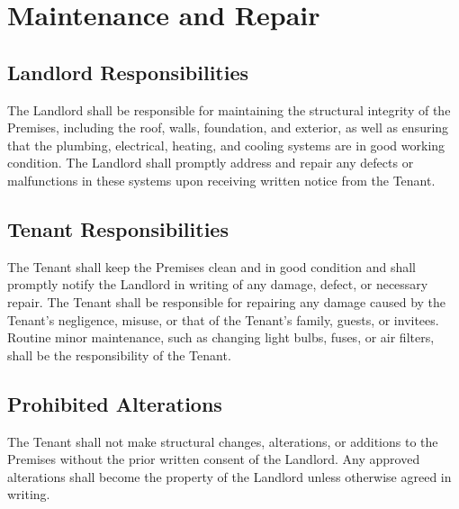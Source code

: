 
\section{Maintenance and Repair}
\label{sec:maintenance}

\subsection{Landlord Responsibilities}
\label{sec:landlordresponsibilities}
The Landlord shall be responsible for maintaining the structural integrity of the Premises, including the roof, walls, foundation, and exterior, as well as ensuring that the plumbing, electrical, heating, and cooling systems are in good working condition. The Landlord shall promptly address and repair any defects or malfunctions in these systems upon receiving written notice from the Tenant.

\subsection{Tenant Responsibilities}
\label{sec:tenantresponsibilities}
The Tenant shall keep the Premises clean and in good condition and shall promptly notify the Landlord in writing of any damage, defect, or necessary repair. The Tenant shall be responsible for repairing any damage caused by the Tenant’s negligence, misuse, or that of the Tenant’s family, guests, or invitees. Routine minor maintenance, such as changing light bulbs, fuses, or air filters, shall be the responsibility of the Tenant.

\subsection{Prohibited Alterations}
\label{sec:prohibitedalterations}
The Tenant shall not make structural changes, alterations, or additions to the Premises without the prior written consent of the Landlord. Any approved alterations shall become the property of the Landlord unless otherwise agreed in writing.


